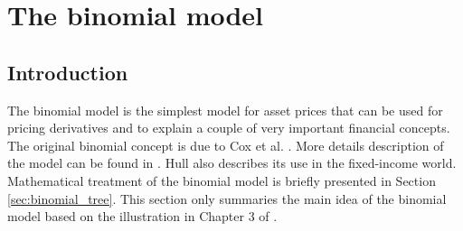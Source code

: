 \section{The binomial model}
\label{sec:intro_binomial_model}
\subsection{Introduction}
The binomial model is the simplest model for asset prices that can be used for pricing derivatives and to explain a couple of very important financial concepts. The original binomial concept is due to Cox et al. \cite{cox_optionpricing_1979}. More details description of the model can be found in \cite{pw_poqf2ed_2006, pw_iqf2ed_2007, ch_ofd9ed_2015}. Hull \cite{ch_ofd9ed_2015} also describes its use in the fixed-income world. Mathematical treatment of the binomial model is briefly presented in Section \ref{sec:binomial_tree}. This section only summaries the main idea of the binomial model based on the illustration in Chapter 3 of \cite{pw_iqf2ed_2007}.

